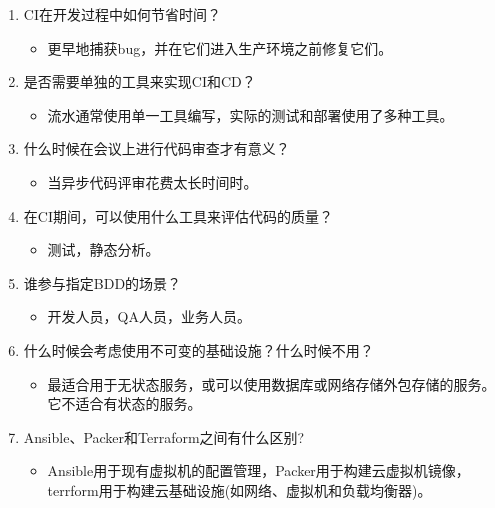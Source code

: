 \begin{enumerate}
\item
CI在开发过程中如何节省时间？
\begin{itemize}
\item 
更早地捕获bug，并在它们进入生产环境之前修复它们。
\end{itemize}

\item
是否需要单独的工具来实现CI和CD？
\begin{itemize}
\item 
流水通常使用单一工具编写，实际的测试和部署使用了多种工具。
\end{itemize}

\item
什么时候在会议上进行代码审查才有意义？
\begin{itemize}
\item 
当异步代码评审花费太长时间时。
\end{itemize}

\item
在CI期间，可以使用什么工具来评估代码的质量？
\begin{itemize}
\item 
测试，静态分析。
\end{itemize}

\item
谁参与指定BDD的场景？
\begin{itemize}
\item 
开发人员，QA人员，业务人员。
\end{itemize}

\item
什么时候会考虑使用不可变的基础设施？什么时候不用？
\begin{itemize}
\item 
最适合用于无状态服务，或可以使用数据库或网络存储外包存储的服务。它不适合有状态的服务。
\end{itemize}

\item
Ansible、Packer和Terraform之间有什么区别?
\begin{itemize}
\item 
Ansible用于现有虚拟机的配置管理，Packer用于构建云虚拟机镜像，terrform用于构建云基础设施(如网络、虚拟机和负载均衡器)。
\end{itemize}
\end{enumerate}